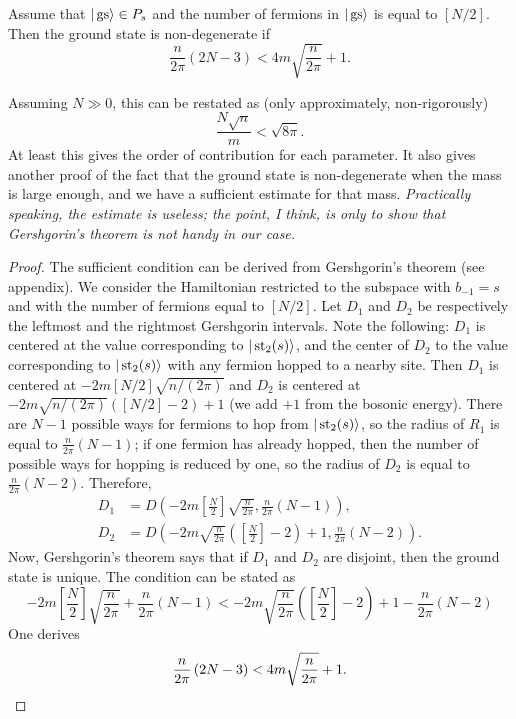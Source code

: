 \begin{proposition}
Assume that $|\operatorname{gs}\rangle \in P_s$ and the number of fermions in $|\operatorname{gs}\rangle$ is equal to $[N/2]$. Then the ground state is non-degenerate if
\[
\frac{n}{2\pi}\left(2N-3\right) < 4m \sqrt{\frac{n}{2\pi}} + 1.
\]
\end{proposition}
Assuming $N \gg 0$, this can be restated as (only approximately, non-rigorously) 
\[
\frac{N \sqrt{n}}{m} < \sqrt{8\pi}.
\]
At least this gives the order of contribution for each parameter. It also gives another proof of the fact that the ground state is non-degenerate when the mass is large enough, and we have a sufficient estimate for that mass. \emph{Practically speaking, the estimate is useless; the point, I think, is only to show that Gershgorin's theorem is not handy in our case.}
\begin{proof}
The sufficient condition can be derived from Gershgorin's theorem (see appendix). We consider the Hamiltonian restricted to the subspace with $b_{-1} = s$ and with the number of fermions equal to $[N/2]$. Let $D_1$ and $D_2$ be respectively the leftmost and the rightmost Gershgorin intervals. Note the following: $D_1$ is centered at the value corresponding to $|\operatorname{st}_2(s)\rangle$, and the center of $D_2$ to the value corresponding to $|\operatorname{st}_2(s)\rangle$ with any fermion hopped to a nearby site. Then $D_1$ is centered at $-2m[N/2]\sqrt{n/(2\pi)}$ and $D_2$ is centered at $-2m\sqrt{n/(2\pi)}([N/2]-2)+1$ (we add $+1$ from the bosonic energy). There are $N-1$ possible ways for fermions to hop from $|\operatorname{st}_2(s)\rangle$, so the radius of $R_1$ is equal to $\frac{n}{2\pi}(N-1)$; if one fermion has already hopped, then the number of possible ways for hopping is reduced by one, so the radius of $D_2$ is equal to $\frac{n}{2\pi}(N-2)$. Therefore,
\[\begin{split}
D_1 &= D\left(-2m\left[\frac{N}{2}\right]\sqrt{\frac{n}{2\pi}}, \frac{n}{2\pi}(N-1)\right),\\
D_2 &= D\left(-2m\sqrt{\frac{n}{2\pi}}\left(\left[\frac{N}{2}\right]-2\right)+1,\frac{n}{2\pi}(N-2)\right).
\end{split}
\]
Now, Gershgorin's theorem says that if $D_1$ and $D_2$ are disjoint, then the ground state is unique. The condition can be stated as
\[
-2m\left[\frac{N}{2}\right]\sqrt{\frac{n}{2\pi}} + \frac{n}{2\pi}(N-1) < -2m\sqrt{\frac{n}{2\pi}}\left(\left[\frac{N}{2}\right]-2\right)+1 - \frac{n}{2\pi}(N-2)
\]
One derives
\[
\frac{n}{2\pi}\left(2N-3\right) < 4m \sqrt{\frac{n}{2\pi}} + 1.\qedhere
\]
\end{proof}

